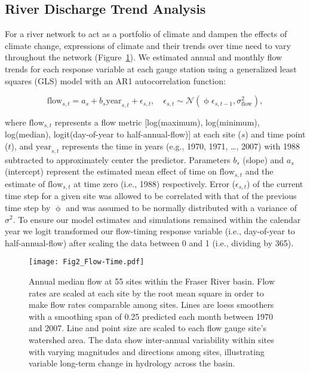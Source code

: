 \documentclass[linenumbers,draft]{AGUJournal}
\begin{document}
\subsection{River Discharge Trend Analysis}
For a river network to act as a portfolio of climate and dampen the effects of climate change, expressions of climate and their trends over time need to vary throughout the network (Figure~\ref{figtwo}). We estimated annual and monthly flow trends for each response variable at each gauge station using a generalized least squares (GLS) model with an AR1 autocorrelation function: 
\begin{linenomath*}
\begin{equation}
  \mathrm{flow}_{s,t} = a_s + b_s \mathrm{year}_{s,t} + \epsilon_{s,t}, \quad 
  \epsilon_{s,t} \sim \mathcal{N}(\upphi \epsilon_{s,t-1}, \sigma_\mathrm{flow}^2) \label{eq1},
\end{equation}
\end{linenomath*}
where $\mathrm{flow}_{s,t}$ represents a flow metric [log(maximum), log(minimum), log(median), logit(day-of-year to half-annual-flow)] at each site ($s$) and time point ($t$),  and $\mathrm{year}_{s,t}$ represents the time in years (e.g., 1970, 1971, \ldots, 2007) with 1988 subtracted to approximately center the predictor. Parameters $b_{s}$ (slope) and $a_{s}$ (intercept) represent the estimated mean effect of time on $\mathrm{flow}_{s,t}$ and the estimate of $\mathrm{flow}_{s,t}$ at time zero (i.e., 1988) respectively. Error ($\epsilon_{s,t}$) of the current time step for a given site was allowed to be correlated with that of the previous time step by $\upphi$ and was assumed to be normally distributed with a variance of $\sigma^{2}$. To ensure our model estimates and simulations remained within the calendar year we logit transformed our flow-timing response variable (i.e., day-of-year to half-annual-flow) after scaling the data between 0 and 1 (i.e., dividing by 365).

\begin{figure}[h]
	\centerline{\texttt{[image: Fig2\_Flow-Time.pdf]}}
	\caption{Annual median flow at 55 sites within the Fraser River basin. Flow rates are scaled at each site by the root mean square in order to make flow rates comparable among sites. Lines are loess smoothers with a smoothing span of 0.25 predicted each month between 1970 and 2007. Line and point size are scaled to each flow gauge site's watershed area. The data show inter-annual variability within sites with varying magnitudes and directions among sites, illustrating variable long-term change in hydrology across the basin.}
	\label{figtwo}
\end{figure}
\end{document}
